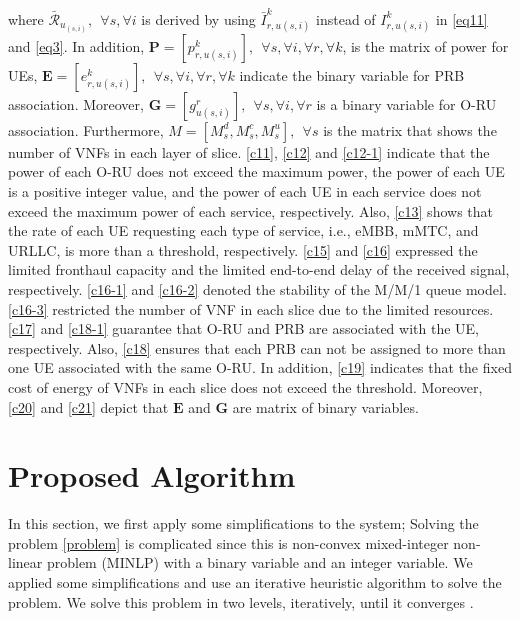 \documentclass[lettersize,journal]{IEEEtran}
\begin{document}
\noindent where $\bar{\mathcal{R}}_{u_{(s,i)}}, \:\:\forall s , \forall i$ is derived by using $\bar{I}_{r,u(s,i)}^{k}$ instead of $I_{r,u(s,i)}^{k}$ in  \eqref{eq11} and \eqref{eq3}.
In addition, $\boldsymbol{P} =[p_{r,u(s,i)}^{k}], \:\: \forall s , \forall i, \forall r, \forall k $, is the matrix of power for UEs, $\boldsymbol{E} =[e_{r,u(s,i)}^k], \:\: \forall s , \forall i, \forall r, \forall k$ indicate the binary variable for PRB association. Moreover, $\boldsymbol{G} =[g_{u(s,i)}^r], \:\: \forall s , \forall i, \forall r$ is a binary variable for O-RU association. Furthermore, $M = [M_s^d, M_s^c, M_s^u], \:\: \forall s$ is the matrix that shows the number of VNFs in each layer of slice.
\eqref{c11}, \eqref{c12} and \eqref{c12-1} indicate that the power of each O-RU does not exceed the maximum power, the power of each UE is a positive integer value, and the power of each UE in each service does not exceed the maximum power of each service, respectively.  
Also, \eqref{c13} shows that the rate of each UE requesting each type of service, i.e., eMBB, mMTC, and URLLC, is more than a threshold, respectively.
\eqref{c15} and \eqref{c16} expressed the limited fronthaul capacity and the limited end-to-end delay of the received signal, respectively.
\eqref{c16-1} and \eqref{c16-2} denoted the stability of the M/M/1 queue model.
\eqref{c16-3} restricted the number of VNF in each slice due to the limited resources.
\eqref{c17} and \eqref{c18-1} guarantee that O-RU and PRB are associated with the UE, respectively.
Also, \eqref{c18} ensures that each PRB can not be assigned to more than one UE associated with the same O-RU.
In addition, \eqref{c19} indicates that the fixed cost of energy of VNFs in each slice does not exceed the threshold. 
Moreover, \eqref{c20} and \eqref{c21} depict that $\boldsymbol{E}$ and $\boldsymbol{G}$ are matrix of binary variables.
\vspace*{-1.7em}
\section{Proposed Algorithm}\label{proAlg}
In this section, we first apply some simplifications to the system; Solving the problem \eqref{problem} is complicated since this is non-convex mixed-integer non-linear problem (MINLP) with a binary variable and an integer variable. 
We applied some simplifications and use an iterative heuristic algorithm to solve the problem.
We solve this problem in two levels, iteratively, until it converges \cite{ali2018joint}.
\end{document}
